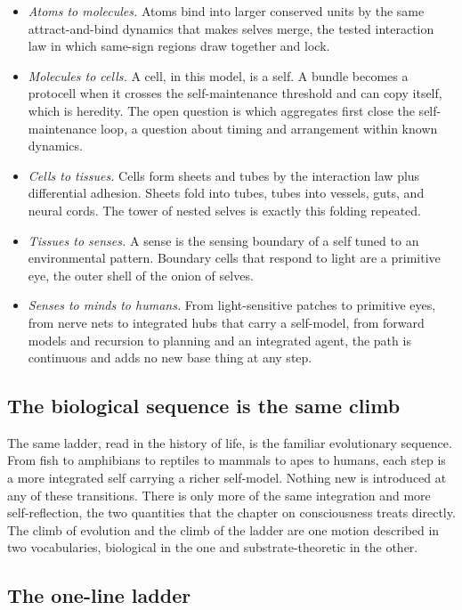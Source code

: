 \begin{itemize}
  \item \emph{Atoms to molecules.} Atoms bind into larger conserved units by the same attract-and-bind dynamics
  that makes selves merge, the tested interaction law in which same-sign regions draw together and lock.
  \item \emph{Molecules to cells.} A cell, in this model, is a self. A bundle becomes a protocell when it crosses
  the self-maintenance threshold and can copy itself, which is heredity. The open question is which aggregates
  first close the self-maintenance loop, a question about timing and arrangement within known dynamics.
  \item \emph{Cells to tissues.} Cells form sheets and tubes by the interaction law plus differential adhesion.
  Sheets fold into tubes, tubes into vessels, guts, and neural cords. The tower of nested selves is exactly this
  folding repeated.
  \item \emph{Tissues to senses.} A sense is the sensing boundary of a self tuned to an environmental pattern.
  Boundary cells that respond to light are a primitive eye, the outer shell of the onion of selves.
  \item \emph{Senses to minds to humans.} From light-sensitive patches to primitive eyes, from nerve nets to
  integrated hubs that carry a self-model, from forward models and recursion to planning and an integrated agent,
  the path is continuous and adds no new base thing at any step.
\end{itemize}

\subsection{The biological sequence is the same climb}

The same ladder, read in the history of life, is the familiar evolutionary sequence. From fish to amphibians to
reptiles to mammals to apes to humans, each step is a more integrated self carrying a richer self-model. Nothing
new is introduced at any of these transitions. There is only more of the same integration and more self-reflection,
the two quantities that the chapter on consciousness treats directly. The climb of evolution and the climb of the
ladder are one motion described in two vocabularies, biological in the one and substrate-theoretic in the other.

\subsection{The one-line ladder}

